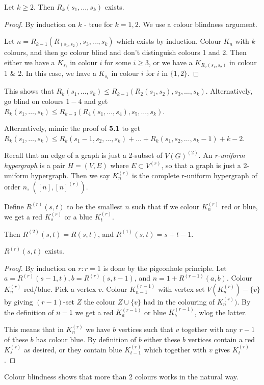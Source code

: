 \documentclass[10pt,a4paper]{article}
\begin{document}
\begin{theorem}
Let $k\geq 2$. Then $R_k(s_1, \ldots, s_k)$ exists.
\end{theorem}
\begin{proof}
By induction on $k$ - true for $k=1,2$. We use a colour blindness argument.

Let $n = R_{k-1}(R_(s_1,s_2),s_3,\ldots, s_k)$ which exists by induction. Colour $K_n$ with $k$ colours, and then go colour blind and don't distinguish colours 1 and 2. Then either we have a $K_{s_i}$ in colour $i$ for some $i \geq 3$, or we have a $K_{R_2(s_1,s_2)}$ in colour 1 \& 2. In this case, we have a $K_{s_i}$ in colour $i$ for $i$ in $\{1,2\}$.
\end{proof}

This shows that $R_k(s_1,\ldots,s_k) \leq R_{k-1}(R_2(s_1,s_2),s_3,\ldots,s_k)$. Alternatively, go blind on colours $1-4$ and get $R_k(s_1,\ldots,s_k) \leq R_{k-3}(R_4(s_1,\ldots, s_4),s_5,\ldots, s_k)$.

Alternatively, mimic the proof of \textbf{5.1} to get $R_k(s_1,\ldots, s_k) \leq R_k(s_1-1,s_2,\ldots,s_k) + \ldots + R_k(s_1,s_2,\ldots, s_k-1) + k-2$.

Recall that an edge of a graph is just a 2-subset of $V(G)^{(2)}$. An \emph{r-uniform hypergraph} is a pair $H = (V,E)$ where $E \subset V^{(r)}$, so that a graph is just a 2-uniform hypergraph. Then we say $K_n^{(r)}$ is the complete r-uniform hypergraph of order $n$, $([n],[n]^{(r)})$.

Define $R^{(r)}(s,t)$ to be the smallest $n$ such that if we colour $K_n^{(r)}$ red or blue, we get a red $K_s^{(r)}$ or a blue $K_t^{(r)}$.

Then $R^{(2)}(s,t) = R(s,t)$, and $R^{(1)}(s,t) = s+t-1$.

\begin{theorem}
$R^{(r)}(s,t)$ exists.
\end{theorem}
\begin{proof}
By induction on $r: r=1$ is done by the pigeonhole principle. Let $a = R^{(r)}(s-1,t), b = R^{(r)}(s,t-1)$, and $n=1+R^{(r-1)}(a,b)$. Colour $K_n^{(r)}$ red/blue. Pick a vertex $v$. Colour $K_{n-1}^{(r-1)}$ with vertex set $V(K_n^{(r)}) - \{v\}$ by giving $(r-1)$-set $Z$ the colour $Z\cup\{v\}$ had in the colouring of $K_n^{(r)})$. By the definition of $n-1$ we get a red $K_a^{(r-1)}$ or blue $K_b^{(r-1)}$, wlog the latter.

This means that in $K_n^{(r)}$ we have $b$ vertices such that $v$ together with any $r-1$ of these $b$ has colour blue. By definition of $b$ either these $b$ vertices contain a red $K_s^{(r)}$ as desired, or they contain blue $K_{t-1}^{(r)}$ which together with $v$ gives $K_t^{(r)}$.
\end{proof}
Colour blindness shows that more than 2 colours works in the natural way.
\end{document}
